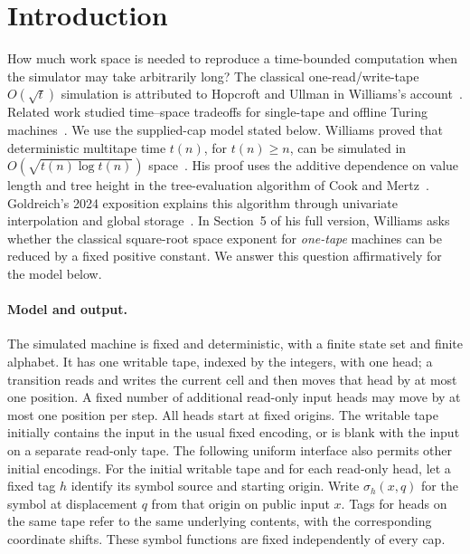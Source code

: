\section{Introduction}
\label{sec:introduction}

How much work space is needed to reproduce a time-bounded computation
when the simulator may take arbitrarily long?
The classical one-read/write-tape \(O(\sqrt t)\) simulation is attributed
to Hopcroft and Ullman in Williams's account~\cite[Section~2.1]{Williams2025}.
Related work studied time--space tradeoffs for single-tape and offline
Turing machines~\cite{Paterson1972,IbarraMoran1983,LiskiewiczLorys1990}.
We use the supplied-cap model stated below.
Williams proved that deterministic multitape time \(t(n)\), for
\(t(n)\ge n\), can be simulated in
\(O(\sqrt{t(n)\log t(n)})\) space~\cite[Theorem~1.1]{Williams2025}.
His proof uses the additive dependence on value length and tree height
in the tree-evaluation algorithm of Cook and Mertz~\cite[Theorem~7]{CookMertz2024}.
Goldreich's 2024 exposition explains this algorithm through univariate
interpolation and global storage~\cite{Goldreich2024}.
In Section~5 of his full version, Williams asks whether the classical
square-root space exponent for \emph{one-tape} machines can be reduced
by a fixed positive constant. We answer this question affirmatively for
the model below.

\paragraph{Model and output.}
The simulated machine is fixed and deterministic, with a finite state
set and finite alphabet. It has one writable tape, indexed by the
integers, with one head; a transition reads and writes the current cell
and then moves that head by at most one position.
A fixed number of additional read-only input heads may move by at most
one position per step. All heads start at fixed origins.
The writable tape initially contains the input in the usual fixed
encoding, or is blank with the input on a separate read-only tape.
The following uniform interface also permits other initial encodings.
For the initial writable tape and for each read-only head, let a fixed
tag \(h\) identify its symbol source and starting origin. Write
\(\sigma_h(x,q)\) for the symbol at displacement \(q\) from that
origin on public input \(x\). Tags for heads on the same tape refer to
the same underlying contents, with the corresponding coordinate shifts.
These symbol functions are fixed independently of every cap.

